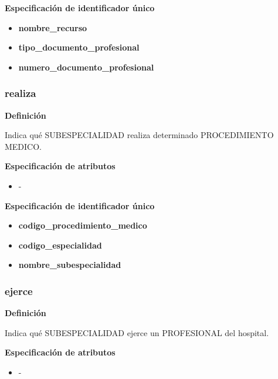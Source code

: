 \documentclass[a4paper,11pt]{article}
\begin{document}
\textbf{Especificación de identificador único}

\begin{itemize}

    \item \textbf{nombre\_recurso}
   
    \item \textbf{tipo\_documento\_profesional}
    
    \item \textbf{numero\_documento\_profesional} 
   	 

\end{itemize}

\subsubsection{\textbf{realiza}}

\textbf{Definición}

Indica qué SUBESPECIALIDAD realiza determinado PROCEDIMIENTO MEDICO.

\textbf{Especificación de atributos}

\begin{itemize}
\item -
\end{itemize}

\textbf{Especificación de identificador único}

\begin{itemize}

    \item \textbf{codigo\_procedimiento\_medico}
   
    \item \textbf{codigo\_especialidad}
   
    \item \textbf{nombre\_subespecialidad}

\end{itemize}

\subsubsection{\textbf{ejerce}}

\textbf{Definición}

Indica qué SUBESPECIALIDAD ejerce un PROFESIONAL del hospital.

\textbf{Especificación de atributos}

\begin{itemize}
\item -
\end{itemize}
\end{document}
